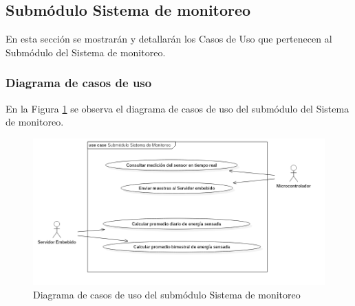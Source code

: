 \subsection{Submódulo Sistema de monitoreo}
En esta sección se mostrarán y detallarán los Casos de Uso que pertenecen al Submódulo del Sistema de monitoreo.
\subsubsection{Diagrama de casos de uso}
En la Figura \ref{fig:dcu-moduloMonitoreo} se observa el diagrama de casos de uso del submódulo del Sistema de monitoreo.
\begin{figure}[H]
	\centering
	\includegraphics[scale=.6]{Capitulo4/software/submodulos/mediciones/images/dcuSubMonitoreo.png}
	\caption{Diagrama de casos de uso del submódulo Sistema de monitoreo}
	\label{fig:dcu-moduloMonitoreo}
\end{figure}





%
%
%
%
%
%
%
%
%